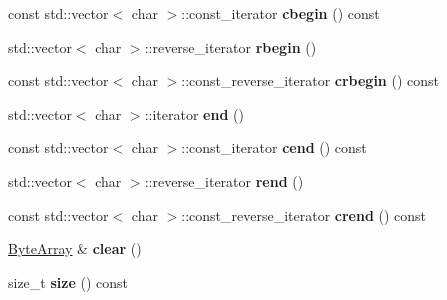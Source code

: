 \begin{DoxyCompactItemize}
const std\+::vector$<$ char $>$\+::const\+\_\+iterator {\bfseries cbegin} () const
\item 
\mbox{\label{class_cpp_serial_port_1_1_byte_array_a7531a1636f7309e7e3071b03f0a4c3ec}} 
std\+::vector$<$ char $>$\+::reverse\+\_\+iterator {\bfseries rbegin} ()
\item 
\mbox{\label{class_cpp_serial_port_1_1_byte_array_a6b5a1909626fd69bb0b7b1edddbdc305}} 
const std\+::vector$<$ char $>$\+::const\+\_\+reverse\+\_\+iterator {\bfseries crbegin} () const
\item 
\mbox{\label{class_cpp_serial_port_1_1_byte_array_a7ec886b5df3959bd609533371c5f35eb}} 
std\+::vector$<$ char $>$\+::iterator {\bfseries end} ()
\item 
\mbox{\label{class_cpp_serial_port_1_1_byte_array_a108876f39ce7301ffc80d166f7e06d16}} 
const std\+::vector$<$ char $>$\+::const\+\_\+iterator {\bfseries cend} () const
\item 
\mbox{\label{class_cpp_serial_port_1_1_byte_array_abe2f611dfdc320573e10f171a87f01a8}} 
std\+::vector$<$ char $>$\+::reverse\+\_\+iterator {\bfseries rend} ()
\item 
\mbox{\label{class_cpp_serial_port_1_1_byte_array_a0dafa827bdea28dad5c10f7d69983a92}} 
const std\+::vector$<$ char $>$\+::const\+\_\+reverse\+\_\+iterator {\bfseries crend} () const
\item 
\mbox{\label{class_cpp_serial_port_1_1_byte_array_a48bf7d4cd12c3702918025afb54a2f3e}} 
\mbox{\hyperlink{class_cpp_serial_port_1_1_byte_array}{Byte\+Array}} \& {\bfseries clear} ()
\item 
\mbox{\label{class_cpp_serial_port_1_1_byte_array_a189aeb360394d6c2126252f34c3e182b}} 
size\+\_\+t {\bfseries size} () const
\item 
\mbox{\label{class_cpp_serial_port_1_1_byte_array_adb5d869f9cdf24ea28a02a03e714159b}} 

\end{DoxyCompactItemize}
